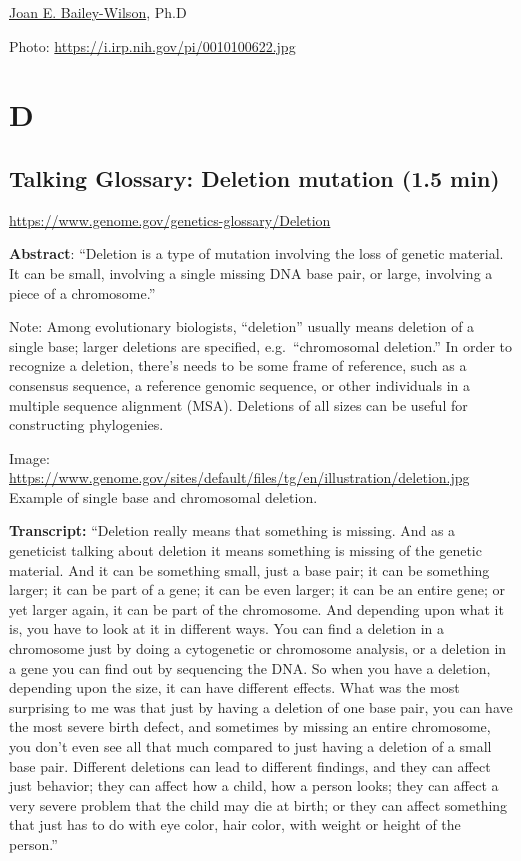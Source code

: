 \documentclass[
]{book}
\begin{document}
\href{https://www.genome.gov/staff/Joan-E-Bailey-Wilson-PhD}{Joan E. Bailey-Wilson}, Ph.D

Photo: \url{https://i.irp.nih.gov/pi/0010100622.jpg}

\hypertarget{d}{%
\chapter{D}\label{d}}

\hypertarget{talking-glossary-deletion-mutation-1.5-min}{%
\section{Talking Glossary: Deletion mutation (1.5 min)}\label{talking-glossary-deletion-mutation-1.5-min}}

\url{https://www.genome.gov/genetics-glossary/Deletion}

\textbf{Abstract}: ``Deletion is a type of mutation involving the loss of genetic material. It can be small, involving a single missing DNA base pair, or large, involving a piece of a chromosome.''

Note: Among evolutionary biologists, ``deletion'' usually means deletion of a single base; larger deletions are specified, e.g.~``chromosomal deletion.'' In order to recognize a deletion, there's needs to be some frame of reference, such as a consensus sequence, a reference genomic sequence, or other individuals in a multiple sequence alignment (MSA). Deletions of all sizes can be useful for constructing phylogenies.

Image: \url{https://www.genome.gov/sites/default/files/tg/en/illustration/deletion.jpg}
Example of single base and chromosomal deletion.

\textbf{Transcript:} ``Deletion really means that something is missing. And as a geneticist talking about deletion it means something is missing of the genetic material. And it can be something small, just a base pair; it can be something larger; it can be part of a gene; it can be even larger; it can be an entire gene; or yet larger again, it can be part of the chromosome. And depending upon what it is, you have to look at it in different ways. You can find a deletion in a chromosome just by doing a cytogenetic or chromosome analysis, or a deletion in a gene you can find out by sequencing the DNA. So when you have a deletion, depending upon the size, it can have different effects. What was the most surprising to me was that just by having a deletion of one base pair, you can have the most severe birth defect, and sometimes by missing an entire chromosome, you don't even see all that much compared to just having a deletion of a small base pair. Different deletions can lead to different findings, and they can affect just behavior; they can affect how a child, how a person looks; they can affect a very severe problem that the child may die at birth; or they can affect something that just has to do with eye color, hair color, with weight or height of the person.''
\end{document}
